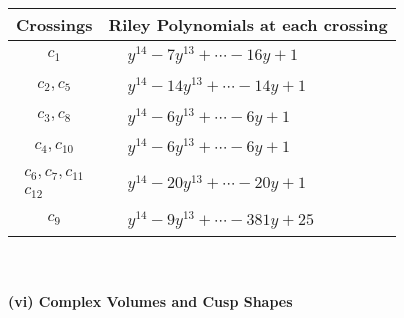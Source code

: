 \documentclass[1p]{elsarticle_modified}
\theoremstyle{definition}
\begin{document}
\begin{tabular}{m{50pt}|m{274pt}}
Crossings & \hspace{64pt}Riley Polynomials at each crossing \\
\hline $$\begin{aligned}c_{1}\end{aligned}$$&$\begin{aligned}
&y^{14}-7 y^{13}+\cdots-16 y+1
\end{aligned}$\\
\hline $$\begin{aligned}c_{2},c_{5}\end{aligned}$$&$\begin{aligned}
&y^{14}-14 y^{13}+\cdots-14 y+1
\end{aligned}$\\
\hline $$\begin{aligned}c_{3},c_{8}\end{aligned}$$&$\begin{aligned}
&y^{14}-6 y^{13}+\cdots-6 y+1
\end{aligned}$\\
\hline $$\begin{aligned}c_{4},c_{10}\end{aligned}$$&$\begin{aligned}
&y^{14}-6 y^{13}+\cdots-6 y+1
\end{aligned}$\\
\hline $$\begin{aligned}c_{6},c_{7},c_{11}\\c_{12}\end{aligned}$$&$\begin{aligned}
&y^{14}-20 y^{13}+\cdots-20 y+1
\end{aligned}$\\
\hline $$\begin{aligned}c_{9}\end{aligned}$$&$\begin{aligned}
&y^{14}-9 y^{13}+\cdots-381 y+25
\end{aligned}$\\
\hline
\end{tabular}\\~\\
\newpage\flushleft \textbf{(vi) Complex Volumes and Cusp Shapes}
\end{document}

